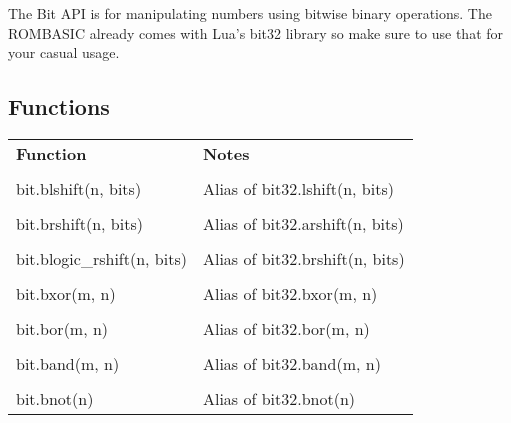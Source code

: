 The Bit API is for manipulating numbers using bitwise binary operations. The ROMBASIC already comes with Lua's bit32 library so make sure to use that for your casual usage.

\subsection{Functions}

\begin{tabularx}{\textwidth}{l X}
	\textbf{\large Function} & \textbf{\large Notes}
	\\ \\
	\endhead
	bit.blshift(n, bits) & Alias of bit32.lshift(n, bits)
	\\ \\
	bit.brshift(n, bits) & Alias of bit32.arshift(n, bits)
	\\ \\
	bit.blogic\_rshift(n, bits) & Alias of bit32.brshift(n, bits)
	\\ \\
	bit.bxor(m, n) & Alias of bit32.bxor(m, n)
	\\ \\
	bit.bor(m, n) & Alias of bit32.bor(m, n)
	\\ \\
	bit.band(m, n) & Alias of bit32.band(m, n)
	\\ \\
	bit.bnot(n) & Alias of bit32.bnot(n)
\end{tabularx}